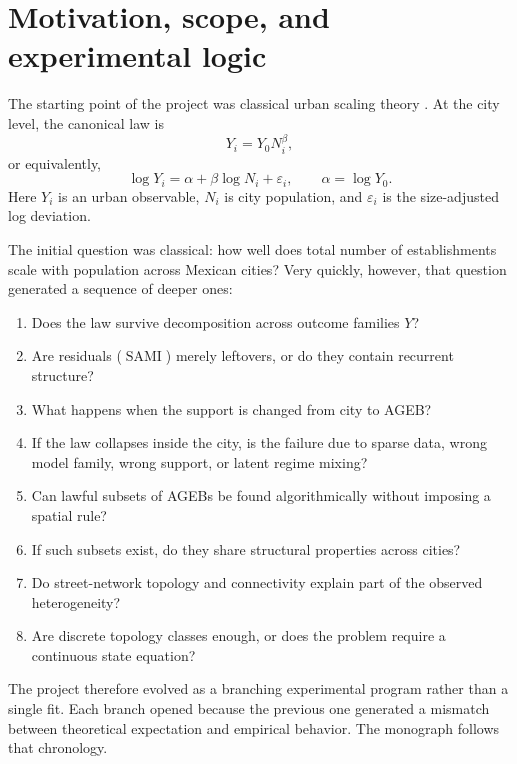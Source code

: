 \documentclass[11pt]{article}
\newcommand{\SAMI}{\operatorname{SAMI}}
\begin{document}
\tableofcontents
\clearpage

\section{Motivation, scope, and experimental logic}

The starting point of the project was classical urban scaling theory \citep{bettencourt2007growth,bettencourt2010urban,bettencourt2013origins,bettencourt2021ius}. At the city level, the canonical law is
\begin{equation}
Y_i = Y_0 N_i^\beta,
\label{eq:canonical-power}
\end{equation}
or equivalently,
\begin{equation}
\log Y_i = \alpha + \beta \log N_i + \varepsilon_i,
\qquad \alpha = \log Y_0.
\label{eq:canonical-log}
\end{equation}
Here \(Y_i\) is an urban observable, \(N_i\) is city population, and \(\varepsilon_i\) is the size-adjusted log deviation.

The initial question was classical: how well does total number of establishments scale with population across Mexican cities? Very quickly, however, that question generated a sequence of deeper ones:
\begin{enumerate}[label=\textbf{Q\arabic*.},leftmargin=2.4em]
\item Does the law survive decomposition across outcome families \(Y\)?
\item Are residuals (\(\SAMI\)) merely leftovers, or do they contain recurrent structure?
\item What happens when the support is changed from city to AGEB?
\item If the law collapses inside the city, is the failure due to sparse data, wrong model family, wrong support, or latent regime mixing?
\item Can lawful subsets of AGEBs be found algorithmically without imposing a spatial rule?
\item If such subsets exist, do they share structural properties across cities?
\item Do street-network topology and connectivity explain part of the observed heterogeneity?
\item Are discrete topology classes enough, or does the problem require a continuous state equation?
\end{enumerate}

The project therefore evolved as a branching experimental program rather than a single fit. Each branch opened because the previous one generated a mismatch between theoretical expectation and empirical behavior. The monograph follows that chronology.
\end{document}
